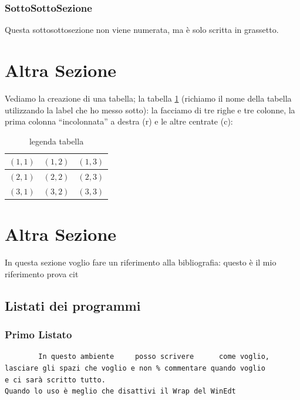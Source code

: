 \documentclass[12pt,a4paper,openright,twoside]{report}
\begin{document}
\subsubsection{SottoSottoSezione}Questa sottosottosezione non viene
numerata, ma \`e solo scritta in grassetto.


\section{Altra Sezione} %
Vediamo la creazione di una tabella; la tabella \ref{tab:uno}
(richiamo il nome della tabella utilizzando la label che ho messo sotto):
la facciamo di tre righe e tre colonne, la prima colonna
``incolonnata'' a destra (r) e le altre centrate (c):\\
\begin{table}[h] %
\begin{center} %
\begin{tabular}{r|c|c} %
\hline \hline                           %
$(1,1)$ & $(1,2)$ & $(1,3)$\\ %
\hline                                  %
$(2,1)$ & $(2,2)$ & $(2,3)$\\ %
\hline                                  %
$(3,1)$ & $(3,2)$ & $(3,3)$\\
\hline \hline                           %
\end{tabular}
\caption[legenda elenco tabelle]{legenda tabella}\label{tab:uno}
\end{center}
\end{table}


\section{Altra Sezione}\label{sec:prova}%
In questa sezione voglio fare un riferimento alla bibliografia: questo \`e il mio riferimento 
prova cit \cite{enisa_threat_landscape}

\subsection{Listati dei programmi}
\subsubsection{Primo Listato}
\begin{verbatim}
        In questo ambiente     posso scrivere      come voglio,
lasciare gli spazi che voglio e non % commentare quando voglio
e ci sarà scritto tutto.
Quando lo uso è meglio che disattivi il Wrap del WinEdt
\end{verbatim}
\clearpage{\pagestyle{empty}\cleardoublepage}
\end{document}
